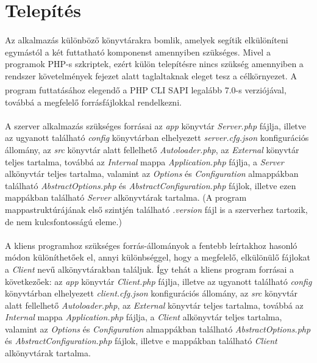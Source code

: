 \documentclass[12pt]{report}
\begin{document}
\pagebreak

\section{Telepítés}
\paragraph{}
Az alkalmazás különböző könyvtárakra bomlik, amelyek segítik elkülöníteni egymástól a két futtatható komponenst amennyiben szükséges. Mivel a programok PHP-s szkriptek, ezért külön telepítésre nincs szükség amennyiben a rendszer követelmények fejezet alatt taglaltaknak eleget tesz a célkörnyezet. A program futtatásához elegendő a PHP CLI SAPI\textsuperscript{\cite{phpcli}} legalább 7.0-s verziójával, továbbá a megfelelő forrásfájlokkal rendelkezni.
\paragraph{}
A szerver alkalmazás szükséges forrásai az \textit{app} könyvtár \textit{Server.php} fájlja, illetve az ugyanott található \textit{config} könyvtárban elhelyezett \textit{server.cfg.json} konfigurációs állomány, az \textit{src} könyvtár alatt fellelhető \textit{Autoloader.php}, az \textit{External} könyvtár teljes tartalma, továbbá az \textit{Internal} mappa \textit{Application.php} fájlja, a \textit{Server} alkönyvtár teljes tartalma, valamint az \textit{Options} és \textit{Configuration} almappákban található \textit{AbstractOptions.php} és \textit{AbstractConfiguration.php} fájlok, illetve ezen mappákban található \textit{Server} alkönyvtárak tartalma. (A program mappastruktúrájának első szintjén található \textit{.version} fájl is a szerverhez tartozik, de nem kulcsfontosságú eleme.) 
\paragraph{}
A kliens programhoz szükséges forrás-állományok a fentebb leírtakhoz hasonló módon különíthetőek el, annyi különbséggel, hogy a megfelelő, elkülönülő fájlokat a \textit{Client} nevű alkönyvtárakban találjuk.
Így tehát a kliens program forrásai a következőek: az \textit{app} könyvtár \textit{Client.php} fájlja, illetve az ugyanott található \textit{config} könyvtárban elhelyezett \textit{client.cfg.json} konfigurációs állomány, az \textit{src} könyvtár alatt fellelhető \textit{Autoloader.php}, az \textit{External} könyvtár teljes tartalma, továbbá az \textit{Internal} mappa \textit{Application.php} fájlja, a \textit{Client} alkönyvtár teljes tartalma, valamint az \textit{Options} és \textit{Configuration} almappákban található \textit{AbstractOptions.php} és \textit{AbstractConfiguration.php} fájlok, illetve e mappákban található \textit{Client} alkönyvtárak tartalma.
\end{document}

